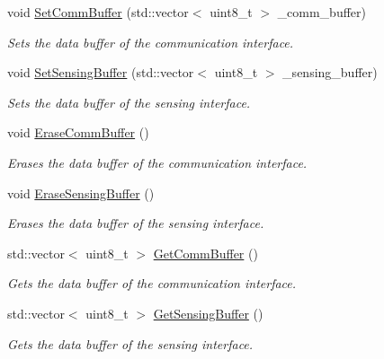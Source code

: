 \begin{DoxyCompactItemize}
void \hyperlink{classosse_1_1collaborate_1_1_node_a222b22c38f2d5c317de945d798a76955}{Set\+Comm\+Buffer} (std\+::vector$<$ uint8\+\_\+t $>$ \+\_\+comm\+\_\+buffer)
\begin{DoxyCompactList}\small\item\em Sets the data buffer of the communication interface. \end{DoxyCompactList}\item 
void \hyperlink{classosse_1_1collaborate_1_1_node_a3bba23d7547d2de96f064d1473628d38}{Set\+Sensing\+Buffer} (std\+::vector$<$ uint8\+\_\+t $>$ \+\_\+sensing\+\_\+buffer)
\begin{DoxyCompactList}\small\item\em Sets the data buffer of the sensing interface. \end{DoxyCompactList}\item 
\mbox{\label{classosse_1_1collaborate_1_1_node_a6db099054b0517bbda3a9765a0b94346}} 
void \hyperlink{classosse_1_1collaborate_1_1_node_a6db099054b0517bbda3a9765a0b94346}{Erase\+Comm\+Buffer} ()
\begin{DoxyCompactList}\small\item\em Erases the data buffer of the communication interface. \end{DoxyCompactList}\item 
\mbox{\label{classosse_1_1collaborate_1_1_node_a08df1f764d1a7f312262b71a7a0250ce}} 
void \hyperlink{classosse_1_1collaborate_1_1_node_a08df1f764d1a7f312262b71a7a0250ce}{Erase\+Sensing\+Buffer} ()
\begin{DoxyCompactList}\small\item\em Erases the data buffer of the sensing interface. \end{DoxyCompactList}\item 
std\+::vector$<$ uint8\+\_\+t $>$ \hyperlink{classosse_1_1collaborate_1_1_node_a509a6e91f68702372c01c4d12885e2fa}{Get\+Comm\+Buffer} ()
\begin{DoxyCompactList}\small\item\em Gets the data buffer of the communication interface. \end{DoxyCompactList}\item 
std\+::vector$<$ uint8\+\_\+t $>$ \hyperlink{classosse_1_1collaborate_1_1_node_a8ea0c9188f90cdb2b186ea6c43c3c9ed}{Get\+Sensing\+Buffer} ()
\begin{DoxyCompactList}\small\item\em Gets the data buffer of the sensing interface. \end{DoxyCompactList}\item 

\end{DoxyCompactItemize}
